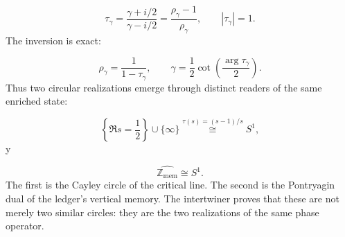 \[
\tau_\gamma
=
\frac{\gamma+i/2}{\gamma-i/2}
=
\frac{\rho_\gamma-1}{\rho_\gamma},
\qquad
|\tau_\gamma|=1.
\]
The inversion is exact:\par
\[
\rho_\gamma=\frac{1}{1-\tau_\gamma},
\qquad
\gamma
=
\frac12\cot\left(\frac{\arg\tau_\gamma}{2}\right).
\]
Thus two circular realizations emerge through distinct readers of the same enriched state:\par
\[
\left\{\Re s=\frac12\right\}\cup\{\infty\}
\overset{\tau(s)=(s-1)/s}{\cong}
S^1,
\]
y\par
\[
\widehat{\mathbb Z_{\mathrm{mem}}}
\cong S^1.
\]
The first is the Cayley circle of the critical line. The second is the Pontryagin dual of the ledger's vertical memory. The intertwiner proves that these are not merely two similar circles: they are the two realizations of the same phase operator.\par
{}
